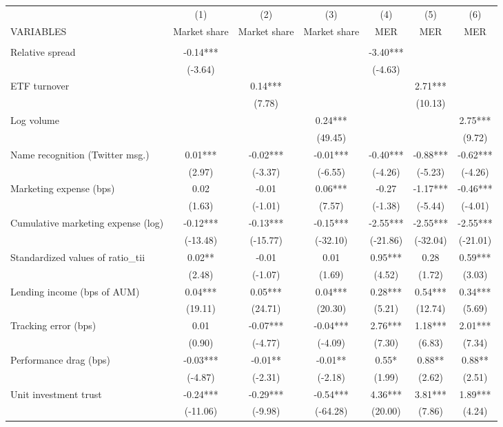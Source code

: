 \documentclass[]{article}
\begin{document}
\begin{tabular}{lcccccc} \hline
 & (1) & (2) & (3) & (4) & (5) & (6) \\
VARIABLES & Market share & Market share & Market share & MER & MER & MER \\ \hline
 &  &  &  &  &  &  \\
Relative spread & -0.14*** &  &  & -3.40*** &  &  \\
 & (-3.64) &  &  & (-4.63) &  &  \\
 ETF turnover &  & 0.14*** &  &  & 2.71*** &  \\
 &  & (7.78) &  &  & (10.13) &  \\
Log volume &  &  & 0.24*** &  &  & 2.75*** \\
 &  &  & (49.45) &  &  & (9.72) \\
Name recognition (Twitter msg.) & 0.01*** & -0.02*** & -0.01*** & -0.40*** & -0.88*** & -0.62*** \\
 & (2.97) & (-3.37) & (-6.55) & (-4.26) & (-5.23) & (-4.26) \\
Marketing expense (bps) & 0.02 & -0.01 & 0.06*** & -0.27 & -1.17*** & -0.46*** \\
 & (1.63) & (-1.01) & (7.57) & (-1.38) & (-5.44) & (-4.01) \\
Cumulative marketing expense (log) & -0.12*** & -0.13*** & -0.15*** & -2.55*** & -2.55*** & -2.55*** \\
 & (-13.48) & (-15.77) & (-32.10) & (-21.86) & (-32.04) & (-21.01) \\
Standardized values of ratio\_tii & 0.02** & -0.01 & 0.01 & 0.95*** & 0.28 & 0.59*** \\
 & (2.48) & (-1.07) & (1.69) & (4.52) & (1.72) & (3.03) \\
Lending income (bps of AUM) & 0.04*** & 0.05*** & 0.04*** & 0.28*** & 0.54*** & 0.34*** \\
 & (19.11) & (24.71) & (20.30) & (5.21) & (12.74) & (5.69) \\
Tracking error (bps) & 0.01 & -0.07*** & -0.04*** & 2.76*** & 1.18*** & 2.01*** \\
 & (0.90) & (-4.77) & (-4.09) & (7.30) & (6.83) & (7.34) \\
Performance drag (bps) & -0.03*** & -0.01** & -0.01** & 0.55* & 0.88** & 0.88** \\
 & (-4.87) & (-2.31) & (-2.18) & (1.99) & (2.62) & (2.51) \\
Unit investment trust & -0.24*** & -0.29*** & -0.54*** & 4.36*** & 3.81*** & 1.89*** \\
 & (-11.06) & (-9.98) & (-64.28) & (20.00) & (7.86) & (4.24) \\


\end{tabular}
\end{document}

